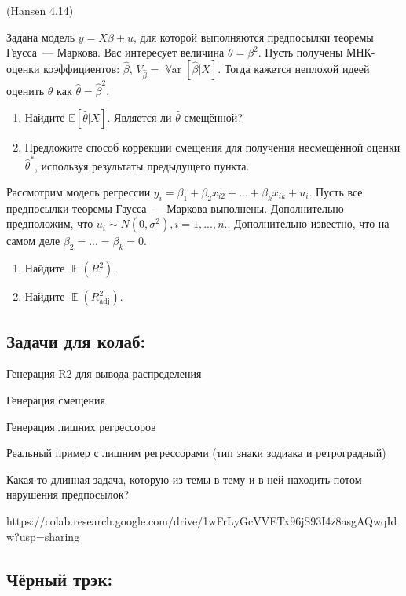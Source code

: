 \documentclass[12pt]{article}
\DeclareMathOperator{\Var}{\mathbb{V}ar}
\DeclareMathOperator{\E}{\mathbb{E}}
\newcommand{\hb}{\hat{\beta}}
\renewcommand{\u}{u}
\newcommand{\adj}{\text{adj}}
\begin{document}
\begin{problem}(Hansen 4.14)

Задана модель $y = X \beta + u$, для которой выполняются предпосылки теоремы Гаусса~--- Маркова. Вас интересует величина $\theta = \beta^2$. Пусть получены МНК-оценки коэффициентов: $\hb$, $V_{\hb} = \Var [\hb | X]$. Тогда кажется неплохой идеей оценить $\theta$ как $\hat{\theta} = \hb^2$.

\begin{enumerate}
    \item Найдите $\mathbb{E} [\hat{\theta} | X]$. Является ли $\hat{\theta}$ смещённой?
    
    \item Предложите способ коррекции смещения для получения несмещённой оценки  $\hat{\theta}^*$, используя результаты предыдущего пункта.
\end{enumerate}

\end{problem}

\begin{problem}
Рассмотрим модель регрессии $y_i = \beta_1 + \beta_2x_{i2} + ... +\beta_kx_{ik} + \u_i$. Пусть все предпосылки теоремы Гаусса~--- Маркова выполнены. Дополнительно предположим, что $\u_i \sim N(0,\sigma^2), i=1,...,n.$. Дополнительно известно, что на самом деле $\beta_2 = ... = \beta_k = 0$.
\begin{enumerate}
\item Найдите $\E(R^2)$.
\item Найдите $\E(R^2_{\adj})$.
\end{enumerate}
\end{problem}

\subsection{Задачи для колаб:}

Генерация R2 для вывода распределения

Генерация смещения

Генерация лишних регрессоров

Реальный пример с лишним регрессорами (тип знаки зодиака и ретроградный)

Какая-то длинная задача, которую из темы в тему и в ней находить потом нарушения предпосылок?



https://colab.research.google.com/drive/1wFrLyGcVVETx96jS93I4z8asgAQwqIdw?usp=sharing

\subsection{Чёрный трэк:}
\end{document}
